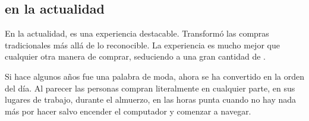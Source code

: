 

		\subsection{\ecommerceCOM en la actualidad}

			En la actualidad, \ecommerceCOM es una experiencia destacable. Transformó las compras tradicionales más allá de lo reconocible. La experiencia es mucho mejor que cualquier otra manera de comprar, seduciendo a una gran cantidad de \ecommerceCOM \lovers.

			Si hace algunos años \ecommerceCOM fue una palabra de moda, ahora se ha convertido en la orden del día. Al parecer las personas compran literalmente en cualquier parte, en sus lugares de trabajo, durante el almuerzo, en las horas punta cuando no hay nada más por hacer salvo encender el computador y comenzar a navegar.

